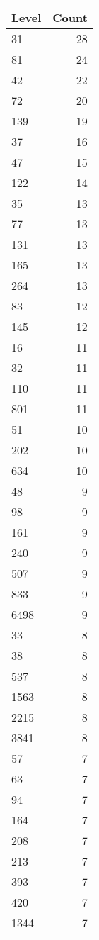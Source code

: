 \begin{table}[ht]
\centering
\begin{tabular}{lr}
  \hline
Level & Count \\ 
  \hline
31 &  28 \\ 
  81 &  24 \\ 
  42 &  22 \\ 
  72 &  20 \\ 
  139 &  19 \\ 
  37 &  16 \\ 
  47 &  15 \\ 
  122 &  14 \\ 
  35 &  13 \\ 
  77 &  13 \\ 
  131 &  13 \\ 
  165 &  13 \\ 
  264 &  13 \\ 
  83 &  12 \\ 
  145 &  12 \\ 
  16 &  11 \\ 
  32 &  11 \\ 
  110 &  11 \\ 
  801 &  11 \\ 
  51 &  10 \\ 
  202 &  10 \\ 
  634 &  10 \\ 
  48 &   9 \\ 
  98 &   9 \\ 
  161 &   9 \\ 
  240 &   9 \\ 
  507 &   9 \\ 
  833 &   9 \\ 
  6498 &   9 \\ 
  33 &   8 \\ 
  38 &   8 \\ 
  537 &   8 \\ 
  1563 &   8 \\ 
  2215 &   8 \\ 
  3841 &   8 \\ 
  57 &   7 \\ 
  63 &   7 \\ 
  94 &   7 \\ 
  164 &   7 \\ 
  208 &   7 \\ 
  213 &   7 \\ 
  393 &   7 \\ 
  420 &   7 \\ 
  1344 &   7 \\ 

\end{tabular}
\end{table}
